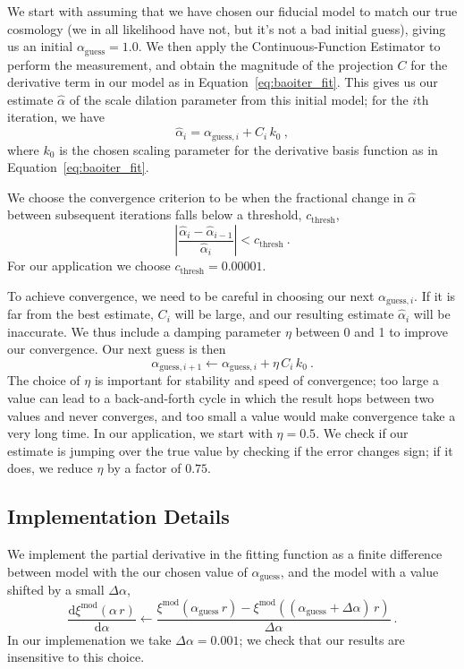 \documentclass[modern]{aastex62}
\newcommand{\est}{the Continuous-Function Estimator\xspace}
\newcommand{\dd}{\mathrm{d}}
\begin{document}
We start with assuming that we have chosen our fiducial model to match our true cosmology (we in all likelihood have not, but it's not a bad initial guess), giving us an initial $\alpha_\mathrm{guess} = 1.0$. 
We then apply \est to perform the measurement, and obtain the magnitude of the projection $C$ for the derivative term in our model as in Equation~\ref{eq:baoiter_fit}. 
This gives us our estimate $\hat{\alpha}$ of the scale dilation parameter from this initial model; for the $i$th iteration, we have
\begin{equation}
    \hat{\alpha}_{i} = \alpha_{\mathrm{guess},i} + C_i \, k_0 ~,
\end{equation}
where $k_0$ is the chosen scaling parameter for the derivative basis function as in Equation~\ref{eq:baoiter_fit}.

We choose the convergence criterion to be when the fractional change in $\hat{\alpha}$ between subsequent iterations falls below a threshold, $c_\mathrm{thresh}$,
\begin{equation}
    \left| \frac{\hat{\alpha}_i - \hat{\alpha}_{i-1}}{\hat{\alpha}_i} \right| < c_\mathrm{thresh} ~.
\end{equation}
For our application we choose $c_\mathrm{thresh} = 0.00001$.

To achieve convergence, we need to be careful in choosing our next $\alpha_{\mathrm{guess},i}$.
If it is far from the best estimate, $C_i$ will be large, and our resulting estimate $\hat{\alpha}_{i}$ will be inaccurate.
We thus include a damping parameter $\eta$ between 0 and 1 to improve our convergence.
Our next guess is then
\begin{equation}
    \alpha_{\mathrm{guess},i+1} \leftarrow \alpha_{\mathrm{guess},i} + \eta\,C_i\,k_0 ~.
\end{equation}
The choice of $\eta$ is important for stability and speed of convergence; too large a value can lead to a back-and-forth cycle in which the result hops between two values and never converges, and too small a value would make convergence take a very long time.
In our application, we start with $\eta=0.5$.
We check if our estimate is jumping over the true value by checking if the error changes sign; if it does, we reduce $\eta$ by a factor of $0.75$.

\subsection{Implementation Details}

We implement the partial derivative in the fitting function as a finite difference between model with the our chosen value of $\alpha_\mathrm{guess}$, and the model with a value shifted by a small $\Delta \alpha$,
\begin{equation}
    \frac{\dd \xi^\mathrm{mod}(\alpha \, r)}{\dd \alpha} \leftarrow \frac{\xi^\mathrm{mod}(\alpha_\mathrm{guess} \, r) - \xi^\mathrm{mod}((\alpha_\mathrm{guess} + \Delta \alpha) \, r)}{\Delta \alpha} ~.
\end{equation}
In our implemenation we take $\Delta \alpha = 0.001$; we check that our results are insensitive to this choice.
\end{document}
